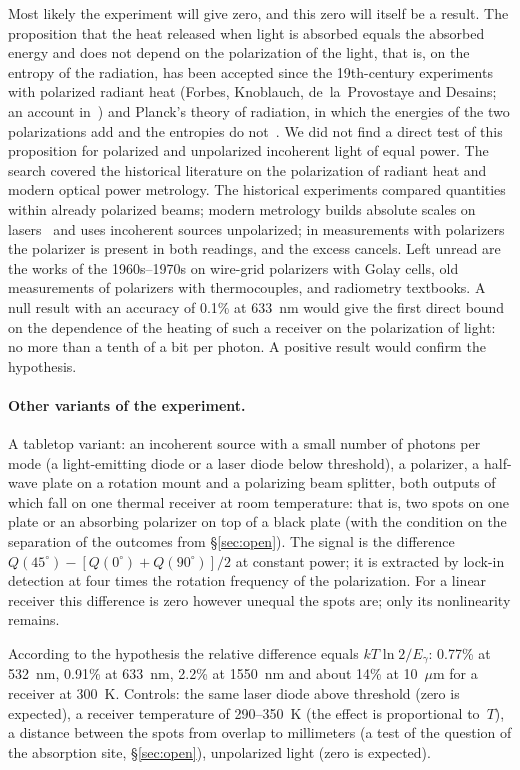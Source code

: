 \documentclass[11pt,a4paper]{article}
\newcommand{\Sref}[1]{\hyperref[#1]{\S\ref{#1}}}
\begin{document}
Most likely the experiment will give zero, and this zero will itself be a result. The proposition that the heat released when light is absorbed equals the absorbed energy and does not depend on the polarization of the light, that is, on the entropy of the radiation, has been accepted since the 19th-century experiments with polarized radiant heat (Forbes, Knoblauch, de~la~Provostaye and Desains; an account in~\cite{desains1860}) and Planck's theory of radiation, in which the energies of the two polarizations add and the entropies do not~\cite{planck1914}. We did not find a direct test of this proposition for polarized and unpolarized incoherent light of equal power. The search covered the historical literature on the polarization of radiant heat and modern optical power metrology. The historical experiments compared quantities within already polarized beams; modern metrology builds absolute scales on lasers~\cite{lehman2004,spidell2021} and uses incoherent sources unpolarized; in measurements with polarizers the polarizer is present in both readings, and the excess cancels. Left unread are the works of the 1960s--1970s on wire-grid polarizers with Golay cells, old measurements of polarizers with thermocouples, and radiometry textbooks. A null result with an accuracy of 0.1\% at 633~nm would give the first direct bound on the dependence of the heating of such a receiver on the polarization of light: no more than a tenth of a bit per photon. A positive result would confirm the hypothesis.

\paragraph{Other variants of the experiment.}
A tabletop variant: an incoherent source with a small number of photons per mode (a light-emitting diode or a laser diode below threshold), a polarizer, a half-wave plate on a rotation mount and a polarizing beam splitter, both outputs of which fall on one thermal receiver at room temperature: that is, two spots on one plate or an absorbing polarizer on top of a black plate (with the condition on the separation of the outcomes from \Sref{sec:open}). The signal is the difference $Q(45^\circ)-[Q(0^\circ)+Q(90^\circ)]/2$ at constant power; it is extracted by lock-in detection at four times the rotation frequency of the polarization. For a linear receiver this difference is zero however unequal the spots are; only its nonlinearity remains.

According to the hypothesis the relative difference equals $kT\ln 2/E_\gamma$: 0.77\% at 532~nm, 0.91\% at 633~nm, 2.2\% at 1550~nm and about 14\% at 10~$\mu$m for a receiver at 300~K. Controls: the same laser diode above threshold (zero is expected), a receiver temperature of 290--350~K (the effect is proportional to~$T$), a distance between the spots from overlap to millimeters (a test of the question of the absorption site, \Sref{sec:open}), unpolarized light (zero is expected).
\end{document}
